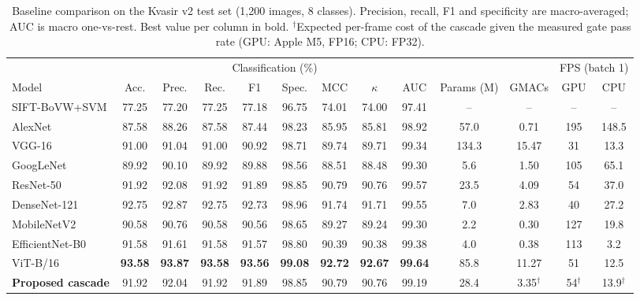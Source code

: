 \begin{table}[t]
\caption{Baseline comparison on the Kvasir v2 test set (1,200 images, 8 classes). Precision, recall, F1 and
specificity are macro-averaged; AUC is macro one-vs-rest. Best value per column in bold.
$^\dagger$Expected per-frame cost of the cascade given the measured gate pass rate (GPU: Apple M5, FP16; CPU: FP32).}
\label{tab:main}\centering\setlength{\tabcolsep}{4.2pt}
\begin{tabular}{lcccccccc|cccc}\toprule
 & \multicolumn{8}{c|}{Classification (\%)} & & & \multicolumn{2}{c}{FPS (batch 1)}\\
Model & Acc. & Prec. & Rec. & F1 & Spec. & MCC & $\kappa$ & AUC & Params (M) & GMACs & GPU & CPU\\\midrule
SIFT-BoVW+SVM & 77.25 & 77.20 & 77.25 & 77.18 & 96.75 & 74.01 & 74.00 & 97.41 & -- & -- & -- & -- \\
AlexNet & 87.58 & 88.26 & 87.58 & 87.44 & 98.23 & 85.95 & 85.81 & 98.92 & 57.0 & 0.71 & 195 & 148.5 \\
VGG-16 & 91.00 & 91.04 & 91.00 & 90.92 & 98.71 & 89.74 & 89.71 & 99.34 & 134.3 & 15.47 & 31 & 13.3 \\
GoogLeNet & 89.92 & 90.10 & 89.92 & 89.88 & 98.56 & 88.51 & 88.48 & 99.30 & 5.6 & 1.50 & 105 & 65.1 \\
ResNet-50 & 91.92 & 92.08 & 91.92 & 91.89 & 98.85 & 90.79 & 90.76 & 99.57 & 23.5 & 4.09 & 54 & 37.0 \\
DenseNet-121 & 92.75 & 92.87 & 92.75 & 92.73 & 98.96 & 91.74 & 91.71 & 99.55 & 7.0 & 2.83 & 40 & 27.2 \\
MobileNetV2 & 90.58 & 90.76 & 90.58 & 90.56 & 98.65 & 89.27 & 89.24 & 99.30 & 2.2 & 0.30 & 127 & 19.8 \\
EfficientNet-B0 & 91.58 & 91.61 & 91.58 & 91.57 & 98.80 & 90.39 & 90.38 & 99.38 & 4.0 & 0.38 & 113 & 3.2 \\
ViT-B/16 & \textbf{93.58} & \textbf{93.87} & \textbf{93.58} & \textbf{93.56} & \textbf{99.08} & \textbf{92.72} & \textbf{92.67} & \textbf{99.64} & 85.8 & 11.27 & 51 & 12.5 \\\midrule
\textbf{Proposed cascade} & 91.92 & 92.04 & 91.92 & 91.89 & 98.85 & 90.79 & 90.76 & 99.19 & 28.4 & 3.35$^\dagger$ & 54$^\dagger$ & 13.9$^\dagger$ \\
\bottomrule\end{tabular}\end{table}

